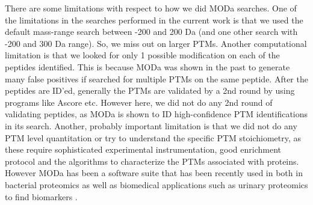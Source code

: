 \documentclass[12pt]{article}
\begin{document}





There are some limitations with respect to how we did MODa searches. One of the limitations in the searches performed in the current work is that we used the default mass-range search between -200 and 200 Da (and one other search with -200 and 300 Da range). So, we miss out on larger PTMs. Another computational limitation is that we looked for only 1 possible modification on each of the peptides identified. This is because MODa was shown in the past to generate many false positives if searched for multiple PTMs on the same peptide. After the peptides are ID'ed, generally the PTMs are validated by a 2nd round by using programs like Ascore etc. However here, we did not do any 2nd round of validating peptides, as MODa is shown to ID high-confidence PTM identifications in its search. Another, probably important limitation is that we did not do any PTM level quantitation or try to understand the specific PTM stoichiometry, as these require sophisticated experimental instrumentation, good enrichment protocol and the algorithms to characterize the PTMs associated with proteins. However MODa has been a software suite that has been recently used in both in bacterial proteomics as well as biomedical applications such as urinary proteomics to find biomarkers \cite{Liuetal2013}.
\end{document}
